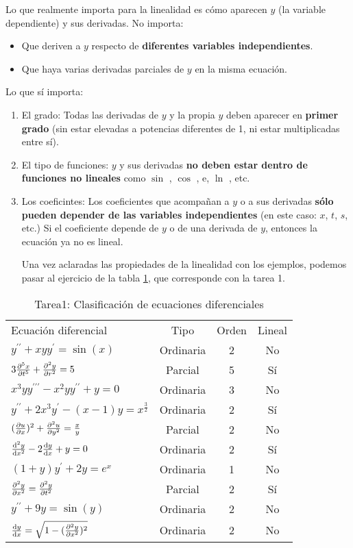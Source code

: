 \documentclass[12pt]{article} %
\theoremstyle{remark} %
\begin{document}
Lo que realmente importa para la linealidad es cómo aparecen $y$ (la variable dependiente) y sus derivadas.
No importa: 
\begin{itemize}
  \item Que deriven a $y$ respecto de \textbf{diferentes variables independientes}.
  \item Que haya varias derivadas parciales de $y$ en la misma ecuación.
\end{itemize}
Lo que sí importa:
\begin{enumerate}
\item El grado: Todas las derivadas de $y$ y la propia $y$ deben aparecer en \textbf{primer grado} (sin estar elevadas a potencias diferentes de 1, ni estar multiplicadas entre sí).
\item El tipo de funciones: $y$ y sus derivadas \textbf{no deben estar dentro de funciones no lineales} como $\sin$ , $\cos$ , e, $\ln$ , etc.
\item Los coeficintes: Los coeficientes que acompañan a $y$ o a sus derivadas \textbf{sólo pueden depender de las variables independientes} (en este caso: $x$, $t$, $s$, etc.)
Si el coeficiente depende de $y$ o de una derivada de $y$, entonces la ecuación ya no es lineal.

Una vez aclaradas las propiedades de la linealidad con los ejemplos, podemos pasar al ejercicio de la tabla \ref{tab:EjercicioClasificacion}, que corresponde con la tarea 1.
\end{enumerate}

\begin{table}[H]
  \centering
  \caption{Tarea1: Clasificación de ecuaciones diferenciales}
  \label{tab:EjercicioClasificacion}
  \begin{tabular}{lccc}
    Ecuación diferencial & Tipo & Orden & Lineal \\[0.5em]
    $y^{\prime \prime} + xyy^{\prime} = \sin (x)$ & Ordinaria & 2 & No \\[0.6em]
    $3 \pdv[5]{x}{t} + \pdv[2]{y}{r} = 5$ & Parcial & 5 & Sí \\[0.6em]
    $x^3yy^{\prime \prime \prime} - x^2yy^{\prime \prime} + y = 0$ & Ordinaria & 3 & No \\[0.6em]
    $y^{\prime \prime} + 2x^3y^{\prime} - (x-1)y = x^{\frac{3}{2}}$ & Ordinaria & 2 & Sí \\[0.6em]
    $(\pdv{u}{x})^2 + \pdv[2]{u}{y} = \frac{x}{y}$ &Parcial & 2 & No \\[0.6em]
    $\dv[2]{y}{x} - 2 \dv{y}{x} + y = 0$ & Ordinaria & 2 & Sí \\[0.6em]
    $(1+y)y^{\prime} + 2y = e^x$ & Ordinaria & 1 & No \\[0.6em]
    $\pdv[2]{y}{x} = \pdv[2]{y}{t}$ & Parcial & 2 & Sí \\[0.6em]
    $y^{\prime \prime} + 9y = \sin (y)$ & Ordinaria & 2 & No \\[0.6em]
    $\dv{y}{x} = \sqrt{1 - (\pdv[2]{y}{x})^2}$ & Ordinaria & 2 & No
  \end{tabular}
\end{table}
\end{document}
